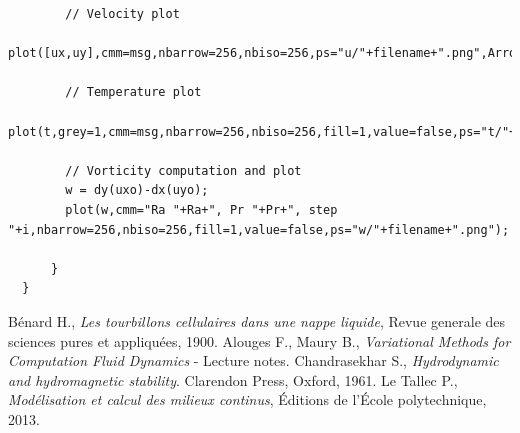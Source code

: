 \documentclass[12pt,oneside]{article}
\begin{document}
\begin{lstlisting}
        // Velocity plot
        plot([ux,uy],cmm=msg,nbarrow=256,nbiso=256,ps="u/"+filename+".png",ArrowSize=-2.9);
        
		// Temperature plot
        plot(t,grey=1,cmm=msg,nbarrow=256,nbiso=256,fill=1,value=false,ps="t/"+filename+".png");
        
        // Vorticity computation and plot
      	w = dy(uxo)-dx(uyo);
        plot(w,cmm="Ra "+Ra+", Pr "+Pr+", step "+i,nbarrow=256,nbiso=256,fill=1,value=false,ps="w/"+filename+".png");
        
      }
  }
\end{lstlisting}

\clearpage
\begin{thebibliography}{}

 Bénard H., {\it Les tourbillons cellulaires dans une nappe liquide}, Revue generale des sciences pures et appliquées, 1900.
 Alouges F., Maury B., {\it Variational Methods for Computation Fluid Dynamics} - Lecture notes.
 Chandrasekhar S., {\it Hydrodynamic and hydromagnetic stability}. Clarendon Press, Oxford, 1961.
 Le Tallec P., {\it Modélisation et calcul des milieux continus}, Éditions de l'École polytechnique, 2013.

\end{thebibliography}
\end{document}
